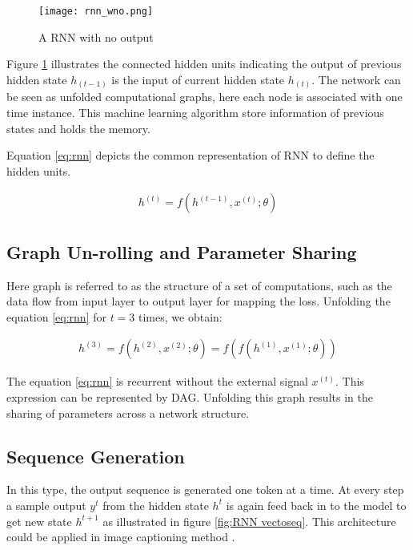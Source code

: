 \begin{figure}[H]
    \centering    
    \texttt{[image: rnn\_wno.png]}
    \caption{A \acl*{RNN} with no output \parencite[Page 370]{Goodfellow-et-al-2016}}
    \label{fig:RNN without output}
\end{figure}


Figure \ref{fig:RNN without output} illustrates the connected hidden units indicating the output of previous hidden state $h_{(t-1)}$ is the input of current hidden state $h_{(t)}$.  The network can be seen as unfolded computational graphs, here each node is associated with one time instance. This machine learning algorithm store information of previous states and holds the memory. 

Equation \ref{eq:rnn} depicts the common representation of RNN to define the hidden units.

\begin{align}
    h^{(t)} = f(h^{(t-1)}, x^{(t)}; \theta) \label{eq:rnn}
 \end{align}



    \subsection*{Graph Un-rolling and Parameter Sharing}
    
    Here graph is referred to as the structure of a set of computations, such as the data flow from input layer to output layer for mapping the loss. Unfolding the equation \ref{eq:rnn} for $t=3$ times, we obtain:
    
    \begin{align}
        h^{(3)} = f(h^{(2)}, x^{(2)}; \theta) = f(f(h^{(1)},x^{(1)}; \theta)) \label{eq:rnn_new}
     \end{align}
    

    The equation \ref{eq:rnn} is recurrent without the external signal $x^{(t)}$. This expression can be represented by \acl{DAG}.  Unfolding this graph results in the sharing of parameters across a network structure.


    \subsection*{Sequence Generation}

    In this type, the output sequence is generated one token at a time. At every step a sample output $y^t$ from the hidden state $h^t$ is again feed back in to the model to get new state $h^{t+1}$ as illustrated in figure \ref{fig:RNN vectoseq}.  This architecture could be applied in image captioning method \parencite[section 15.2.1]{pml1Book}. 


